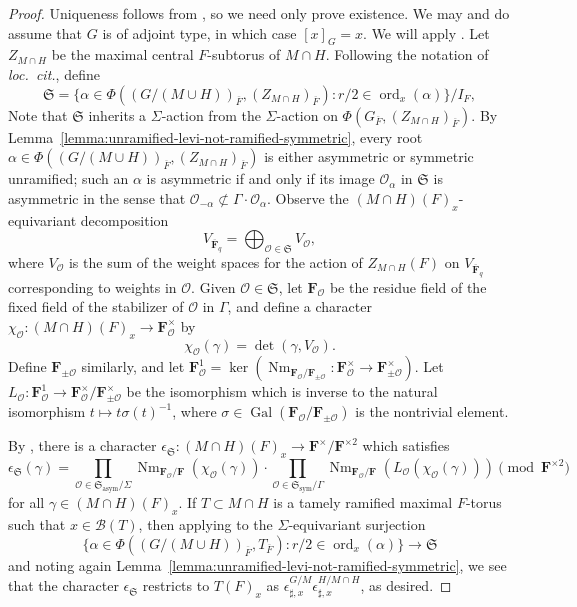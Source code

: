 \documentclass[reqno]{amsart}
\numberwithin{equation}{subsection}
\newcommand{\F}{\mathbf{F}}
\newcommand{\Gal}{\operatorname{Gal}}
\newcommand{\ol}[1]{\overline{#1}}
\newcommand{\co}{\colon}
\newcommand\cB{\mathcal{B}}
\newcommand\cO{\mathcal{O}}
\DeclareMathOperator{\ord}{ord}
\DeclareMathOperator{\Nm}{Nm}
\theoremstyle{remark}
\numberwithin{equation}{subsection}
\numberwithin{figure}{subsection}
\begin{document}
\begin{proof}
Uniqueness follows from \cite[Lemma 3.5]{FKS23}, so we need only prove existence. We may and do assume that $G$ is of adjoint type, in which case $[x]_G = x$. We will apply \cite[Proposition 5.1.13]{FKS23}. Let $Z_{M\cap H}$ be the maximal central $F$-subtorus of $M \cap H$. Following the notation of \textit{loc.\ cit.}, define
\[
\mathfrak{S} = \{\alpha \in \Phi((G/(M \cup H))_{\ol F}, (Z_{M \cap H})_{\ol F})\co r/2 \in \ord_x(\alpha)\}/I_F,
\]
Note that $\mathfrak{S}$ inherits a $\Sigma$-action from the $\Sigma$-action on $\Phi(G_{\ol F}, (Z_{M\cap H})_{\ol F})$. By Lemma~\ref{lemma:unramified-levi-not-ramified-symmetric}, every root $\alpha \in \Phi((G/(M \cup H))_{\ol F}, (Z_{M \cap H})_{\ol F})$ is either asymmetric or symmetric unramified; such an $\alpha$ is asymmetric if and only if its image $\cO_\alpha$ in $\mathfrak{S}$ is asymmetric in the sense that $\cO_{-\alpha} \not\subset \Gamma \cdot \cO_\alpha$. Observe the $(M \cap H)(F)_x$-equivariant decomposition
\[
V_{\ol\F_q} = \bigoplus_{\cO \in \mathfrak{S}} V_\cO,
\]
where $V_\cO$ is the sum of the weight spaces for the action of $Z_{M\cap H}(F)$ on $V_{\ol\F_q}$ corresponding to weights in $\cO$. Given $\cO \in \mathfrak{S}$, let $\F_\cO$ be the residue field of the fixed field of the stabilizer of $\cO$ in $\Gamma$, and define a character $\chi_\cO\co (M \cap H)(F)_x \to \F_\cO^\times$ by
\[
\chi_\cO(\gamma) = \det(\gamma, V_\cO).
\]
Define $\F_{\pm\cO}$ similarly, and let $\F_\cO^1 = \ker(\Nm_{\F_\cO/\F_{\pm\cO}}\co \F_\cO^\times \to \F_{\pm\cO}^\times)$. Let $L_\cO\co \F_\cO^1 \to \F_\cO^\times/\F_{\pm\cO}^\times$ be the isomorphism which is inverse to the natural isomorphism $t \mapsto t\sigma(t)^{-1}$, where $\sigma \in \Gal(\F_\cO/\F_{\pm\cO})$ is the nontrivial element.

By \cite[Proposition 5.1.13]{FKS23}, there is a character $\epsilon_{\mathfrak{S}}\co (M\cap H)(F)_x \to \F^\times/\F^{\times 2}$ which satisfies
\[
\epsilon_{\mathfrak{S}}(\gamma) = \prod_{\cO \in \mathfrak{S}_{\mathrm{asym}}/\Sigma} \Nm_{\F_\cO/\F}(\chi_\cO(\gamma)) \cdot \prod_{\cO \in \mathfrak{S}_{\mathrm{sym}}/\Gamma} \Nm_{\F_\cO/\F}(L_\cO(\chi_\cO(\gamma))) \pmod{\F^{\times 2}}
\]
for all $\gamma \in (M \cap H)(F)_x$. If $T \subset M\cap H$ is a tamely ramified maximal $F$-torus such that $x \in \cB(T)$, then applying \cite[Remark 5.1.12]{FKS23} to the $\Sigma$-equivariant surjection
\[
\{\alpha \in \Phi((G/(M \cup H))_{\ol F}, T_{\ol F})\co r/2 \in \ord_x(\alpha)\} \to \mathfrak{S}
\]
and noting again Lemma~\ref{lemma:unramified-levi-not-ramified-symmetric}, we see that the character $\epsilon_{\mathfrak{S}}$ restricts to $T(F)_x$ as $\epsilon_{\sharp,x}^{G/M}\epsilon_{\sharp,x}^{H/M \cap H}$, as desired.


\end{proof}
\end{document}
